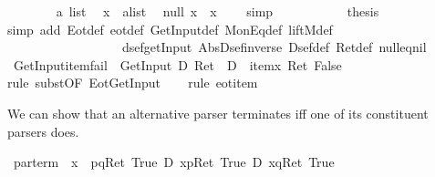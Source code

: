 \begin{isabellebody}
\ \ \ \ \ \ \isamarkupfalse%
\ a\ list\ \isamarkupfalse%
\ {\isachardoublequote}x\ {\isacharequal}\ {\isacharparenleft}a{\isacharhash}list{\isacharparenright}{\isachardoublequote}\ \isamarkupfalse%
\ {\isachardoublequote}null\ x\ {\isacharequal}\ {\isacharparenleft}x\ {\isacharequal}\ {\isacharbrackleft}{\isacharbrackright}{\isacharparenright}{\isachardoublequote}\ \isamarkupfalse%
\ simp\isanewline
\ \ \ \ \isamarkupfalse%
\isanewline
\ \ \isamarkupfalse%
\isanewline
\ \ \isamarkupfalse%
\ {\isacharquery}thesis\isanewline
\ \ \isamarkupfalse%
simp\ add{\isacharcolon}\ Eot{\isacharunderscore}def\ eot{\isacharunderscore}def\ GetInput{\isacharunderscore}def\ MonEq{\isacharunderscore}def\ liftM{}{\isacharunderscore}def\ \isanewline
\ \ \ \ \ \ \ \ \ \ \ \ \ \ \ \ \ \ dsef{\isacharunderscore}getInput\ Abs{\isacharunderscore}Dsef{\isacharunderscore}inverse\ Dsef{\isacharunderscore}def\ Ret{\isacharunderscore}def\ null{\isacharunderscore}eq{\isacharunderscore}nil{\isacharparenright}\isanewline
\isamarkupfalse%
\isanewline
\isanewline
\isamarkupfalse%
\ GetInput{\isacharunderscore}item{\isacharunderscore}fail{\isacharcolon}\ {\isachardoublequote}{\isasymturnstile}\ GetInput\ {\isacharequal}\isactrlsub D\ Ret\ {\isacharbrackleft}{\isacharbrackright}\ {\isasymlongrightarrow}\isactrlsub D\ {\isacharbrackleft}{\isacharhash}\ item{\isacharbrackright}{\isacharparenleft}{\isasymlambda}x{\isachardot}\ Ret\ False{\isacharparenright}{\isachardoublequote}\isanewline
\ \ \isamarkupfalse%
rule\ subst{\isacharbrackleft}OF\ Eot{\isacharunderscore}GetInput{\isacharbrackright}{\isacharparenright}\isanewline
\ \ \isamarkupfalse%
\ {\isacharparenleft}rule\ eot{\isacharunderscore}item{\isacharparenright}\isamarkupfalse%
%
\begin{isamarkuptext}%
We can show that an alternative parser terminates iff one of its constituent
  parsers does.%
\end{isamarkuptext}%
\isamarkuptrue%
\ par{\isacharunderscore}term{\isacharcolon}\ {\isachardoublequote}{\isasymturnstile}\ {\isasymlangle}x\ {\isasymleftarrow}\ p{\isasymparallel}q{\isasymrangle}{\isacharparenleft}Ret\ True{\isacharparenright}\ {\isasymlongleftrightarrow}\isactrlsub D\ {\isasymlangle}x{\isasymleftarrow}p{\isasymrangle}{\isacharparenleft}Ret\ True{\isacharparenright}\ {\isasymor}\isactrlsub D\ {\isasymlangle}x{\isasymleftarrow}q{\isasymrangle}{\isacharparenleft}Ret\ True{\isacharparenright}{\isachardoublequote}\isanewline

\end{isabellebody}
